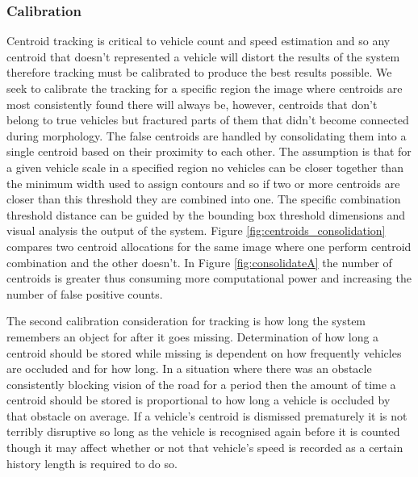 \subsubsection{Calibration}

Centroid tracking is critical to vehicle count and speed estimation and so any centroid that doesn't represented a vehicle will distort the results of the system therefore tracking must be calibrated to produce the best results possible. We seek to calibrate the tracking for a specific region the image where centroids are most consistently found there will always be, however, centroids that don't belong to true vehicles but fractured parts of them that didn't become connected during morphology. The false centroids are handled by consolidating them into a single centroid based on their proximity to each other. The assumption is that for a given vehicle scale in a specified region no vehicles can be closer together than the minimum width used to assign contours and so if two or more centroids are closer than this threshold they are combined into one. The specific combination threshold distance can be guided by the bounding box threshold dimensions and visual analysis the output of the system. Figure \ref{fig:centroids_consolidation} compares two centroid allocations for the same image where one perform centroid combination and the other doesn't. In Figure \ref{fig:consolidateA} the number of centroids is greater thus consuming more computational power and increasing the number of false positive counts. 

The second calibration consideration for tracking is how long the system remembers an object for after it goes missing. Determination of how long a centroid should be stored while missing is dependent on how frequently vehicles are occluded and for how long. In a situation where there was an obstacle consistently blocking vision of the road for a period then the amount of time a centroid should be stored is proportional to how long a vehicle is occluded by that obstacle on average. If a vehicle's centroid is dismissed prematurely it is not terribly disruptive so long as the vehicle is recognised again before it is counted though it may affect whether or not that vehicle's speed is recorded as a certain history length is required to do so. 

